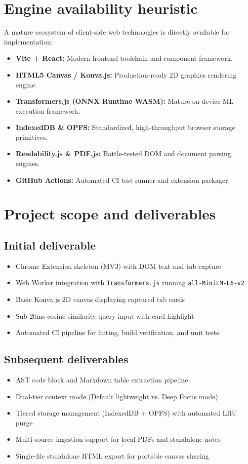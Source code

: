 \documentclass[11pt,a4paper]{article}
\begin{document}
\section{Engine availability heuristic}
A mature ecosystem of client-side web technologies is directly available for implementation:
\begin{itemize}[leftmargin=0.7cm]
    \item \textbf{Vite + React:} Modern frontend toolchain and component framework.
    \item \textbf{HTML5 Canvas / Konva.js:} Production-ready 2D graphics rendering engine.
    \item \textbf{Transformers.js (ONNX Runtime WASM):} Mature on-device ML execution framework.
    \item \textbf{IndexedDB \& OPFS:} Standardized, high-throughput browser storage primitives.
    \item \textbf{Readability.js \& PDF.js:} Battle-tested DOM and document parsing engines.
    \item \textbf{GitHub Actions:} Automated CI test runner and extension packager.
\end{itemize}

\section{Project scope and deliverables}
\subsection{Initial deliverable}
\begin{itemize}[leftmargin=0.7cm]
    \item Chrome Extension skeleton (MV3) with DOM text and tab capture
    \item Web Worker integration with \texttt{Transformers.js} running \texttt{all-MiniLM-L6-v2}
    \item Basic Konva.js 2D canvas displaying captured tab cards
    \item Sub-20ms cosine similarity query input with card highlight
    \item Automated CI pipeline for linting, build verification, and unit tests
\end{itemize}

\subsection{Subsequent deliverables}
\begin{itemize}[leftmargin=0.7cm]
    \item AST code block and Markdown table extraction pipeline
    \item Dual-tier context mode (Default lightweight vs. Deep Focus mode)
    \item Tiered storage management (IndexedDB + OPFS) with automated LRU purge
    \item Multi-source ingestion support for local PDFs and standalone notes
    \item Single-file standalone HTML export for portable canvas sharing
\end{itemize}
\end{document}

